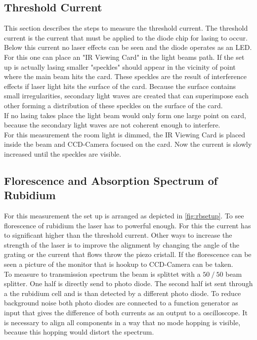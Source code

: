 \subsection{Threshold Current}
\label{sec:ThresholdCurrent}

This section describes the steps to measure the threshold current. 
The threshold current is the current that must be applied to the diode chip for lasing to occur.
Below this current no laser effects can be seen and the diode operates as an LED.
For this one can place an "IR Viewing Card" in the light beams path.
If the set up is actually lasing smaller "speckles" should appear in the vicinity of point where the main beam hits the card.
These speckles are the result of interference effects if laser light hits the surface of the card. 
Because the surface contains small irregularities, secondary light waves are created that can superimpose each other forming a distribution of these speckles on the surface of the card.\\
If no lasing takes place the light beam would only form one large point on card, because the secondary light waves are not coherent enough to interfere.\\

For this measurement the room light is dimmed, the IR Viewing Card is placed inside the beam and CCD-Camera focused on the card.
Now the current is slowly increased until the speckles are visible.

\subsection{Florescence and Absorption Spectrum of Rubidium}
\label{sec:Spectrum}

For this measurement the set up is arranged as depicted in \autoref{fig:rbsetup}.
To see florescence of rubidium the laser has to powerful enough.
For this the current has to significant higher than the threshold current.
Other ways to increase the strength of the laser is to improve the alignment by changing the angle of the grating or the current that flows throw the piezo cristall.
If the florescence can be seen a picture of the monitor that is hookup to CCD-Camera can be taken.\\

To measure to transmission spectrum the beam is splittet with a $50 \mathbin{/}50$ beam splitter.
One half is directly send to photo diode. 
The second half ist sent through a the rubidium cell and is than detected by a different photo diode.
To reduce background noise both photo diodes are connected to a function generator as input that gives the difference of both currents as an output to a oscilloscope.
It is necessary to align all components in a way that no mode hopping is visible, because this hopping would distort the spectrum. 